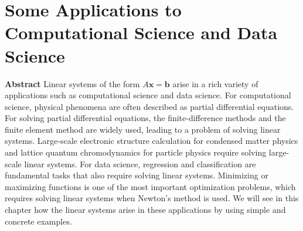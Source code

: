 \clearpage
\section{{Some Applications to Computational Science and Data Science}}\label{chap:computational-applications}
\setcounter{footnote}{0}
\noindent\textbf{{Abstract}}\quad
{Linear systems of the form $A\boldsymbol{x}=\boldsymbol{b}$ arise in a rich variety of applications such as computational science and data science. For computational science, physical phenomena are often described as partial differential equations. For solving partial differential equations, the finite-difference methods and the finite element method are widely used, leading to a problem of solving linear systems. Large-scale electronic structure calculation for condensed matter physics and lattice quantum chromodynamics for particle physics require solving large-scale linear systems. For data science, regression and classification are fundamental tasks that also require solving linear systems. Minimizing or maximizing functions is one of the most important optimization problems, which requires solving linear systems when Newton's method is used. We will see in this chapter how the linear systems arise in these applications by using simple and concrete examples.}
